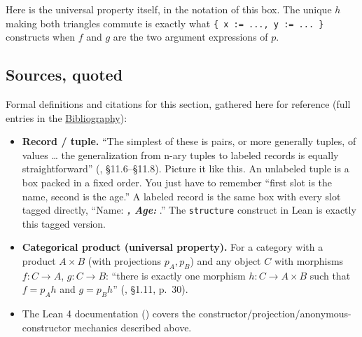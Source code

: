 Here is the universal property itself, in the notation of this box. The unique \(h\) making both triangles commute is exactly what \texttt{\{ x := ..., y := ... \}} constructs when \(f\) and \(g\) are the two argument expressions of \(p\).

\begin{center}

\end{center}

\subsection{Sources, quoted}\label{sec:03-functions-and-structures:01-structure-basics:2}

Formal definitions and citations for this section, gathered here for reference (full entries in the \hyperref[sec:root:bibliography:1]{Bibliography}):

\begin{itemize}
\tightlist
\item
  \textbf{Record / tuple.} ``The simplest of these is pairs, or more generally tuples, of values \ldots{} the generalization from n-ary tuples to labeled records is equally straightforward'' (\cite{Pierce2002}, §11.6--§11.8). Picture it like this. An unlabeled tuple is a box packed in a fixed order. You just have to remember ``first slot is the name, second is the age.'' A labeled record is the same box with every slot tagged directly, ``Name: \textbf{\emph{, Age: }}.'' The \texttt{structure} construct in Lean is exactly this tagged version.
\item
  \textbf{Categorical product (universal property).} For a category with a product \(A \times B\) (with projections \(p_A, p_B\)) and any object \(C\) with morphisms \(f : C \to A\), \(g : C \to B\): ``there is exactly one morphism \(h : C \to A \times B\) such that \(f = p_A h\) and \(g = p_B h\)'' (\cite{Pareigis1970}, §1.11, p.~30).
\item
  The Lean 4 documentation (\cite{LeanDocs}) covers the constructor/projection/anonymous-constructor mechanics described above.
\end{itemize}
